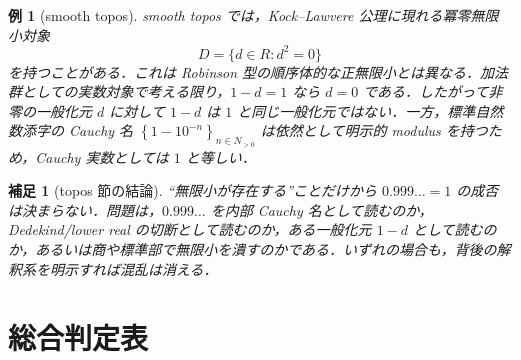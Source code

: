 \documentclass[a4paper,11pt]{ltjsarticle}
\theoremstyle{jpdef}
\newtheorem{remark}[definition]{補足}
\newtheorem{example}[definition]{例}
\theoremstyle{jpthm}
\newcommand{\seq}[2]{\left\{#1\right\}_{#2}}
\begin{document}
\begin{example}[smooth topos]
smooth topos では，Kock--Lawvere 公理に現れる冪零無限小対象
\[
  D=\{d\in R:d^2=0\}
\]
を持つことがある．これは Robinson 型の順序体的な正無限小とは異なる．加法群としての実数対象で考える限り，\(1-d=1\) なら \(d=0\) である．したがって非零の一般化元 \(d\) に対して \(1-d\) は \(1\) と同じ一般化元ではない．一方，標準自然数添字の Cauchy 名 \(\seq{1-10^{-n}}{n\in N_{>0}}\) は依然として明示的 modulus を持つため，Cauchy 実数としては \(1\) と等しい．
\end{example}

\begin{remark}[topos 節の結論]
``無限小が存在する''ことだけから \(0.999\ldots=1\) の成否は決まらない．問題は，\(0.999\ldots\) を内部 Cauchy 名として読むのか，Dedekind/lower real の切断として読むのか，ある一般化元 \(1-d\) として読むのか，あるいは商や標準部で無限小を潰すのかである．いずれの場合も，背後の解釈系を明示すれば混乱は消える．
\end{remark}

\section{総合判定表}
\end{document}

